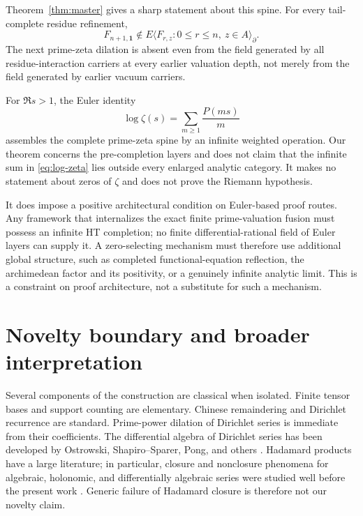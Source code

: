 \documentclass[11pt]{article}
\theoremstyle{definition}
\theoremstyle{remark}
\newcommand{\diff}{\partial}
\begin{document}
Theorem~\ref{thm:master} gives a sharp statement about this spine.  For every tail-complete
residue refinement,
\begin{equation}\label{eq:zeta-spine-escape}
 F_{n+1,\mathbf1}\notin
 E\langle F_{r,z}:0\leq r\leq n,\ z\in A\rangle_{\diff}.
\end{equation}
The next prime-zeta dilation is absent even from the field generated by all residue-interaction
carriers at every earlier valuation depth, not merely from the field generated by earlier vacuum
carriers.

For \(\Re s>1\), the Euler identity
\begin{equation}\label{eq:log-zeta}
 \log\zeta(s)=\sum_{m\geq1}\frac{P(ms)}{m}
\end{equation}
assembles the complete prime-zeta spine by an infinite weighted operation.  Our theorem concerns
the pre-completion layers and does not claim that the infinite sum in \eqref{eq:log-zeta} lies
outside every enlarged analytic category.  It makes no statement about zeros of \(\zeta\) and
does not prove the Riemann hypothesis.

It does impose a positive architectural condition on Euler-based proof routes.  Any framework
that internalizes the exact finite prime-valuation fusion must possess an infinite HT completion;
no finite differential-rational field of Euler layers can supply it.  A zero-selecting mechanism
must therefore use additional global structure, such as completed functional-equation reflection,
the archimedean factor and its positivity, or a genuinely infinite analytic limit.  This is a
constraint on proof architecture, not a substitute for such a mechanism.

\section{Novelty boundary and broader interpretation}\label{sec:novelty}

Several components of the construction are classical when isolated.  Finite tensor bases and
support counting are elementary.  Chinese remaindering and Dirichlet recurrence are standard.
Prime-power dilation of Dirichlet series is immediate from their coefficients.  The differential
algebra of Dirichlet series has been developed by Ostrowski, Shapiro--Sparer, Pong, and others
\cite{Ostrowski1920,ShapiroSparer1986,Pong2016}.  Hadamard products have a large literature;
in particular, closure and nonclosure phenomena for algebraic, holonomic, and differentially
algebraic series were studied well before the present work
\cite{Sharif1999,AlloucheMendesFrance2011}.  Generic failure of Hadamard closure is therefore not
our novelty claim.
\end{document}

